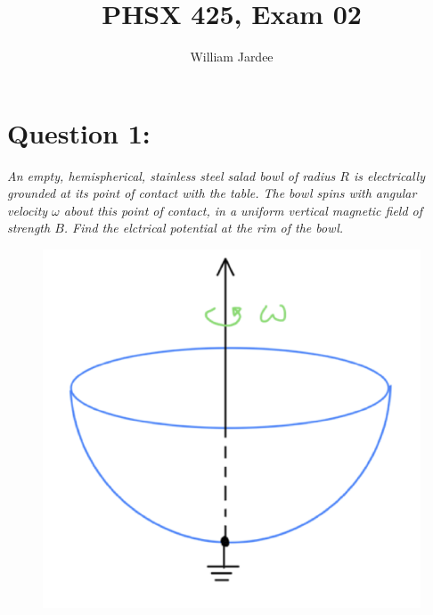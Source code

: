 \documentclass[12pt]{article}
\title{PHSX 425, Exam 02}
\author{William Jardee}
\begin{document}
\maketitle

\section*{Question 1:}
\emph{An empty, hemispherical, stainless steel salad bowl of radius $R$ is electrically grounded at its point of contact with the table. The bowl spins with angular velocity $\omega$ about this point of contact, in a uniform vertical magnetic field of strength $B$. Find the elctrical potential at the rim of the bowl.}
\begin{figure}[h]
\centering
\includegraphics[scale=.5]{exam02_question1.png}
\label{fig:1.1}
\end{figure}
\newpage

\end{document}
